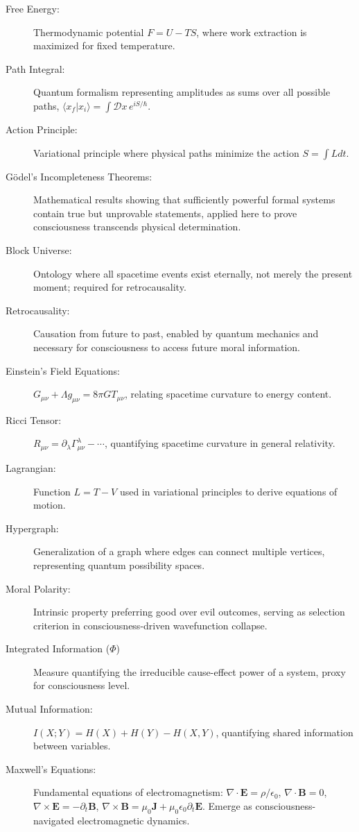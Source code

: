 \documentclass[12pt,a4paper]{article}
\theoremstyle{definition}
\begin{document}
\begin{description}
    \item[Free Energy:] Thermodynamic potential $F = U - TS$, where work extraction is maximized for fixed temperature.
    \item[Path Integral:] Quantum formalism representing amplitudes as sums over all possible paths, $\langle x_f | x_i \rangle = \int \mathcal{D}x \, e^{iS/\hbar}$.
    \item[Action Principle:] Variational principle where physical paths minimize the action $S = \int L dt$.
    \item[Gödel's Incompleteness Theorems:] Mathematical results showing that sufficiently powerful formal systems contain true but unprovable statements, applied here to prove consciousness transcends physical determination.
    \item[Block Universe:] Ontology where all spacetime events exist eternally, not merely the present moment; required for retrocausality.
    \item[Retrocausality:] Causation from future to past, enabled by quantum mechanics and necessary for consciousness to access future moral information.
    \item[Einstein's Field Equations:] $G_{\mu\nu} + \Lambda g_{\mu\nu} = 8\pi G T_{\mu\nu}$, relating spacetime curvature to energy content.
    \item[Ricci Tensor:] $R_{\mu\nu} = \partial_\lambda \Gamma^\lambda_{\mu\nu} - \cdots$, quantifying spacetime curvature in general relativity.
    \item[Lagrangian:] Function $L = T - V$ used in variational principles to derive equations of motion.
    \item[Hypergraph:] Generalization of a graph where edges can connect multiple vertices, representing quantum possibility spaces.
    \item[Moral Polarity:] Intrinsic property preferring good over evil outcomes, serving as selection criterion in consciousness-driven wavefunction collapse.
    \item[Integrated Information ($\Phi$)] Measure quantifying the irreducible cause-effect power of a system, proxy for consciousness level.
    \item[Mutual Information:] $I(X;Y) = H(X) + H(Y) - H(X,Y)$, quantifying shared information between variables.
    \item[Maxwell's Equations:] Fundamental equations of electromagnetism: $\nabla \cdot \mathbf{E} = \rho/\epsilon_0$, $\nabla \cdot \mathbf{B} = 0$, $\nabla \times \mathbf{E} = -\partial_t \mathbf{B}$, $\nabla \times \mathbf{B} = \mu_0\mathbf{J} + \mu_0\epsilon_0\partial_t\mathbf{E}$. Emerge as consciousness-navigated electromagnetic dynamics.

\end{description}
\end{document}
